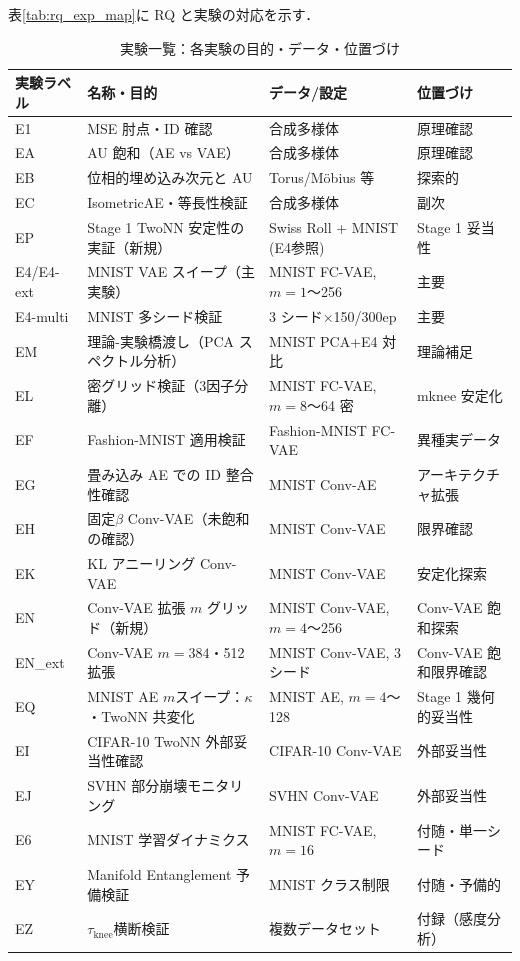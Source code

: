 \documentclass[11pt,a4paper]{jsarticle}
\begin{document}
表\ref{tab:rq_exp_map}に RQ と実験の対応を示す．

\begin{table}[H]
\centering
\caption{実験一覧：各実験の目的・データ・位置づけ}
\label{tab:exp_list}
\small
\begin{tabular}{llll}
\toprule
実験ラベル & 名称・目的 & データ/設定 & 位置づけ \\
\midrule
E1 & MSE 肘点・ID 確認 & 合成多様体 & 原理確認 \\
EA & AU 飽和（AE vs VAE） & 合成多様体 & 原理確認 \\
EB & 位相的埋め込み次元と AU & Torus/Möbius 等 & 探索的 \\
EC & IsometricAE・等長性検証 & 合成多様体 & 副次 \\
EP & Stage 1 TwoNN 安定性の実証（新規） & Swiss Roll + MNIST (E4参照) & Stage 1 妥当性 \\
E4/E4-ext & MNIST VAE スイープ（主実験） & MNIST FC-VAE, $m=1$〜256 & 主要 \\
E4-multi & MNIST 多シード検証 & 3 シード×150/300ep & 主要 \\
EM & 理論-実験橋渡し（PCA スペクトル分析） & MNIST PCA+E4 対比 & 理論補足 \\
EL & 密グリッド検証（3因子分離） & MNIST FC-VAE, $m=8$〜64 密 & mknee 安定化 \\
EF & Fashion-MNIST 適用検証 & Fashion-MNIST FC-VAE & 異種実データ \\
EG & 畳み込み AE での ID 整合性確認 & MNIST Conv-AE & アーキテクチャ拡張 \\
EH & 固定$\beta$ Conv-VAE（未飽和の確認） & MNIST Conv-VAE & 限界確認 \\
EK & KL アニーリング Conv-VAE & MNIST Conv-VAE & 安定化探索 \\
EN & Conv-VAE 拡張 $m$ グリッド（新規） & MNIST Conv-VAE, $m=4$〜256 & Conv-VAE 飽和探索 \\
EN\_ext & Conv-VAE $m=384$・512 拡張 & MNIST Conv-VAE, 3シード & Conv-VAE 飽和限界確認 \\
EQ & MNIST AE $m$スイープ：$\kappa$・TwoNN 共変化 & MNIST AE, $m=4$〜128 & Stage 1 幾何的妥当性 \\
EI & CIFAR-10 TwoNN 外部妥当性確認 & CIFAR-10 Conv-VAE & 外部妥当性 \\
EJ & SVHN 部分崩壊モニタリング & SVHN Conv-VAE & 外部妥当性 \\
E6 & MNIST 学習ダイナミクス & MNIST FC-VAE, $m=16$ & 付随・単一シード \\
EY & Manifold Entanglement 予備検証 & MNIST クラス制限 & 付随・予備的 \\
EZ & $\tau_\mathrm{knee}$横断検証 & 複数データセット & 付録（感度分析） \\
\bottomrule
\end{tabular}
\end{table}
\end{document}
